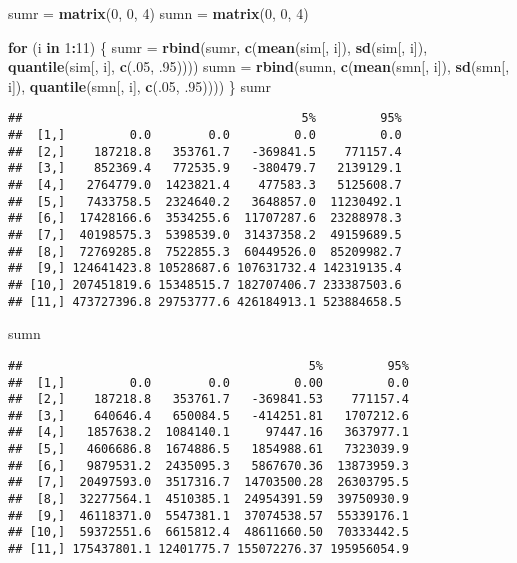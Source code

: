 \documentclass[]{article}
\newenvironment{Shaded}{\begin{snugshade}}{\end{snugshade}}
\newcommand{\ControlFlowTok}[1]{\textcolor[rgb]{0.13,0.29,0.53}{\textbf{#1}}}
\newcommand{\DecValTok}[1]{\textcolor[rgb]{0.00,0.00,0.81}{#1}}
\newcommand{\FloatTok}[1]{\textcolor[rgb]{0.00,0.00,0.81}{#1}}
\newcommand{\KeywordTok}[1]{\textcolor[rgb]{0.13,0.29,0.53}{\textbf{#1}}}
\newcommand{\NormalTok}[1]{#1}
\newcommand{\OperatorTok}[1]{\textcolor[rgb]{0.81,0.36,0.00}{\textbf{#1}}}
\newcommand{\StringTok}[1]{\textcolor[rgb]{0.31,0.60,0.02}{#1}}
\begin{document}
\begin{Shaded}
\begin{Highlighting}[]
\NormalTok{sumr =}\StringTok{ }\KeywordTok{matrix}\NormalTok{(}\DecValTok{0}\NormalTok{, }\DecValTok{0}\NormalTok{, }\DecValTok{4}\NormalTok{)}
\NormalTok{sumn =}\StringTok{ }\KeywordTok{matrix}\NormalTok{(}\DecValTok{0}\NormalTok{, }\DecValTok{0}\NormalTok{, }\DecValTok{4}\NormalTok{)}

\ControlFlowTok{for}\NormalTok{ (i }\ControlFlowTok{in} \DecValTok{1}\OperatorTok{:}\DecValTok{11}\NormalTok{) \{}
\NormalTok{  sumr =}\StringTok{ }\KeywordTok{rbind}\NormalTok{(sumr, }\KeywordTok{c}\NormalTok{(}\KeywordTok{mean}\NormalTok{(sim[, i]), }\KeywordTok{sd}\NormalTok{(sim[, i]), }\KeywordTok{quantile}\NormalTok{(sim[, i], }\KeywordTok{c}\NormalTok{(.}\DecValTok{05}\NormalTok{, }\FloatTok{.95}\NormalTok{))))}
\NormalTok{  sumn =}\StringTok{ }\KeywordTok{rbind}\NormalTok{(sumn, }\KeywordTok{c}\NormalTok{(}\KeywordTok{mean}\NormalTok{(smn[, i]), }\KeywordTok{sd}\NormalTok{(smn[, i]), }\KeywordTok{quantile}\NormalTok{(smn[, i], }\KeywordTok{c}\NormalTok{(.}\DecValTok{05}\NormalTok{, }\FloatTok{.95}\NormalTok{))))}
\NormalTok{\}}
\NormalTok{sumr}
\end{Highlighting}
\end{Shaded}

\begin{verbatim}
##                                       5%         95%
##  [1,]         0.0        0.0         0.0         0.0
##  [2,]    187218.8   353761.7   -369841.5    771157.4
##  [3,]    852369.4   772535.9   -380479.7   2139129.1
##  [4,]   2764779.0  1423821.4    477583.3   5125608.7
##  [5,]   7433758.5  2324640.2   3648857.0  11230492.1
##  [6,]  17428166.6  3534255.6  11707287.6  23288978.3
##  [7,]  40198575.3  5398539.0  31437358.2  49159689.5
##  [8,]  72769285.8  7522855.3  60449526.0  85209982.7
##  [9,] 124641423.8 10528687.6 107631732.4 142319135.4
## [10,] 207451819.6 15348515.7 182707406.7 233387503.6
## [11,] 473727396.8 29753777.6 426184913.1 523884658.5
\end{verbatim}

\begin{Shaded}
\begin{Highlighting}[]
\NormalTok{sumn}
\end{Highlighting}
\end{Shaded}

\begin{verbatim}
##                                        5%         95%
##  [1,]         0.0        0.0         0.00         0.0
##  [2,]    187218.8   353761.7   -369841.53    771157.4
##  [3,]    640646.4   650084.5   -414251.81   1707212.6
##  [4,]   1857638.2  1084140.1     97447.16   3637977.1
##  [5,]   4606686.8  1674886.5   1854988.61   7323039.9
##  [6,]   9879531.2  2435095.3   5867670.36  13873959.3
##  [7,]  20497593.0  3517316.7  14703500.28  26303795.5
##  [8,]  32277564.1  4510385.1  24954391.59  39750930.9
##  [9,]  46118371.0  5547381.1  37074538.57  55339176.1
## [10,]  59372551.6  6615812.4  48611660.50  70333442.5
## [11,] 175437801.1 12401775.7 155072276.37 195956054.9
\end{verbatim}
\end{document}
